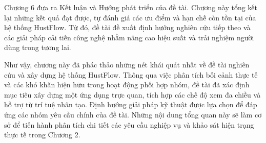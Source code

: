 \documentclass[../DoAn.tex]{subfiles}
\begin{document}
Chương 6 đưa ra Kết luận và Hướng phát triển của đề tài. Chương này tổng kết lại những kết quả đạt được, tự đánh giá các ưu điểm và hạn chế còn tồn tại của hệ thống HustFlow. Từ đó, đề tài đề xuất định hướng nghiên cứu tiếp theo và các giải pháp cải tiến công nghệ nhằm nâng cao hiệu suất và trải nghiệm người dùng trong tương lai.

Như vậy, chương này đã phác thảo những nét khái quát nhất về đề tài nghiên cứu và xây dựng hệ thống HustFlow. Thông qua việc phân tích bối cảnh thực tế và các khó khăn hiện hữu trong hoạt động phối hợp nhóm, đề tài đã xác định mục tiêu xây dựng một ứng dụng trực quan, tích hợp các chế độ xem đa chiều và hỗ trợ từ trí tuệ nhân tạo. Định hướng giải pháp kỹ thuật được lựa chọn để đáp ứng các nhóm yêu cầu chính của đề tài. Những nội dung tổng quan này sẽ làm cơ sở để tiến hành phân tích chi tiết các yêu cầu nghiệp vụ và khảo sát hiện trạng thực tế trong Chương 2.
\end{document}
